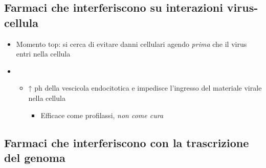 \documentclass[italian,]{article}
\providecommand{\tightlist}{%
  \setlength{\itemsep}{0pt}\setlength{\parskip}{0pt}}
\newcommand{\far}[1]{ \fbox{\textsc{#1}} } %
\begin{document}
\hypertarget{farmaci-che-interferiscono-su-interazioni-virus-cellula}{%
\subsection{Farmaci che interferiscono su interazioni
virus-cellula}\label{farmaci-che-interferiscono-su-interazioni-virus-cellula}}

\begin{itemize}
\item
  Momento top: si cerca di evitare danni cellulari agendo \emph{prima}
  che il virus entri nella cellula
\item
  \far{amantidina}

  \begin{itemize}
  \tightlist
  \item
    ↑ ph della vescicola endocitotica e impedisce l'ingresso del
    materiale virale nella cellula

    \begin{itemize}
    \tightlist
    \item
      Efficace come profilassi, \emph{non come cura}
    \end{itemize}
  \end{itemize}
\end{itemize}

\hypertarget{farmaci-che-interferiscono-con-la-trascrizione-del-genoma}{%
\subsection{Farmaci che interferiscono con la trascrizione del
genoma}\label{farmaci-che-interferiscono-con-la-trascrizione-del-genoma}}
\end{document}
